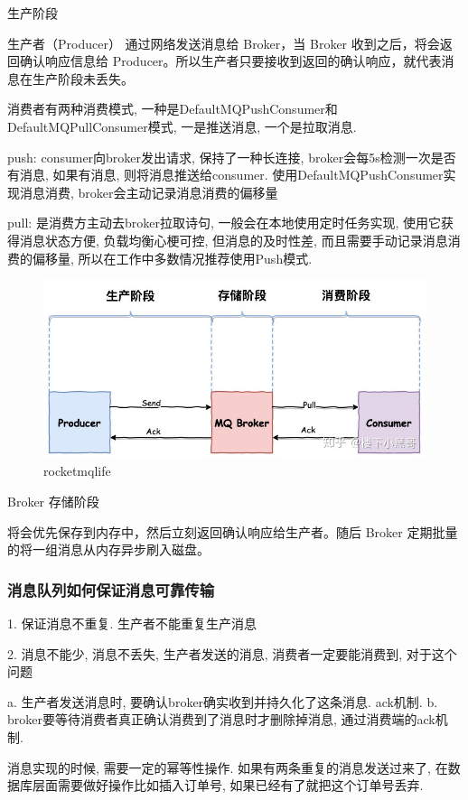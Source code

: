 \documentclass[UTF8]{ctexart}
\begin{document}
生产阶段

生产者（Producer） 通过网络发送消息给 Broker，当 Broker 收到之后，将会返回确认响应信息给 Producer。所以生产者只要接收到返回的确认响应，就代表消息在生产阶段未丢失。

消费者有两种消费模式, 一种是DefaultMQPushConsumer和DefaultMQPullConsumer模式, 一是推送消息, 一个是拉取消息.

push: consumer向broker发出请求, 保持了一种长连接, broker会每5s检测一次是否有消息, 如果有消息, 则将消息推送给consumer. 使用DefaultMQPushConsumer实现消息消费, broker会主动记录消息消费的偏移量

pull: 是消费方主动去broker拉取诗句, 一般会在本地使用定时任务实现, 使用它获得消息状态方便, 负载均衡心梗可控, 但消息的及时性差, 而且需要手动记录消息消费的偏移量, 所以在工作中多数情况推荐使用Push模式.



\begin{figure}
	\centering
	\includegraphics[width=0.7\linewidth]{figures/rocketmqlife.jpg}
	\caption{rocketmqlife}
	\label{fig:rocketmqlife}
\end{figure}


Broker 存储阶段

将会优先保存到内存中，然后立刻返回确认响应给生产者。随后 Broker 定期批量的将一组消息从内存异步刷入磁盘。

\subsubsection{消息队列如何保证消息可靠传输}

1. 保证消息不重复. 生产者不能重复生产消息

2. 消息不能少, 消息不丢失, 生产者发送的消息, 消费者一定要能消费到, 对于这个问题

a. 生产者发送消息时, 要确认broker确实收到并持久化了这条消息. ack机制.
b. broker要等待消费者真正确认消费到了消息时才删除掉消息, 通过消费端的ack机制.

消息实现的时候, 需要一定的幂等性操作. 如果有两条重复的消息发送过来了, 在数据库层面需要做好操作比如插入订单号, 如果已经有了就把这个订单号丢弃.
\end{document}
